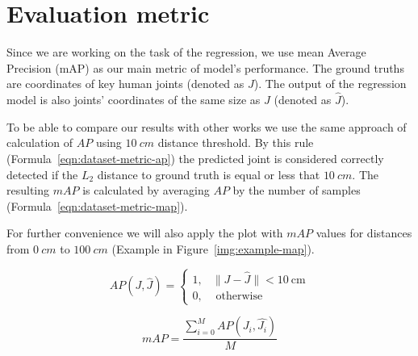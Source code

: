 \section{Evaluation metric}
\label{evaluation-metric}
Since we are working on the task of the regression, we use mean Average Precision (mAP) as our main metric of model's performance. The ground truths are coordinates of key human joints (denoted as $J$). The output of the regression model is also joints' coordinates of the same size as $J$ (denoted as $\hat{J}$).

To be able to compare our results with other works \parencite{haque_towards_2016,moon_v2v-posenet_2018,guo_towards_2017} we use the same approach of calculation of $AP$ using $10 \ cm$ distance threshold. By this rule (Formula~\ref{eqn:dataset-metric-ap}) the predicted joint is considered correctly detected if the $L_2$ distance to ground truth is equal or less that $10 \ cm$. The resulting $mAP$ is calculated by averaging $AP$ by the number of samples (Formula~\ref{eqn:dataset-metric-map}).

For further convenience we will also apply the plot with $mAP$ values for distances from $0 \ cm$ to $100 \ cm$ (Example in Figure~\ref{img:example-map}).

\begin{equation}
\label{eqn:dataset-metric-ap}
AP(J, \hat{J})=\left\{\begin{array}{ll}
    1, & \lVert J - \hat{J} \rVert <10 \mathrm{~cm} \\
    0, & \text { otherwise }
\end{array}\right.
\end{equation}

\begin{equation}
\label{eqn:dataset-metric-map}
    mAP=\frac{\sum_{i=0}^{M} A P\left(J_{i}, \hat{J_{i}}\right)}{M}
\end{equation}

